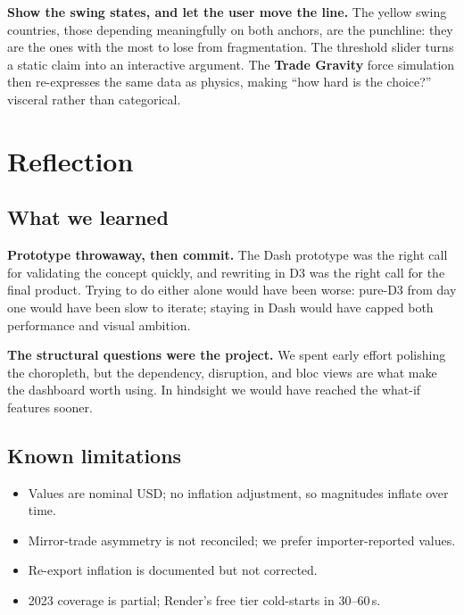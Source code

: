 \documentclass[a4paper,10pt]{article}
\begin{document}
\begin{decision}
\textbf{Show the swing states, and let the user move the line.} The yellow swing
countries, those depending meaningfully on both anchors, are the punchline: they
are the ones with the most to lose from fragmentation. The threshold slider turns
a static claim into an interactive argument. The \textbf{Trade Gravity} force
simulation then re-expresses the same data as physics, making ``how hard is the
choice?'' visceral rather than categorical.
\end{decision}

\section{Reflection}

\subsection{What we learned}

\textbf{Prototype throwaway, then commit.} The Dash prototype was the right call
for validating the concept quickly, and rewriting in D3 was the right call for the
final product. Trying to do either alone would have been worse: pure-D3 from day
one would have been slow to iterate; staying in Dash would have capped both
performance and visual ambition.

\textbf{The structural questions were the project.} We spent early effort polishing
the choropleth, but the dependency, disruption, and bloc views are what make the
dashboard worth using. In hindsight we would have reached the what-if features
sooner.

\subsection{Known limitations}
\begin{itemize}
  \item Values are nominal USD; no inflation adjustment, so magnitudes inflate over time.
  \item Mirror-trade asymmetry is not reconciled; we prefer importer-reported values.
  \item Re-export inflation is documented but not corrected.
  \item 2023 coverage is partial; Render's free tier cold-starts in 30--60\,s.
\end{itemize}
\end{document}
